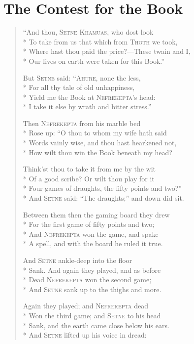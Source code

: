 \documentclass[12pt]{article}
\newcommand{\vin}{\hspace{1em}}
\begin{document}
\section*{The Contest for the Book}

\begin{verse}
``And thou, \textsc{Setne Khamuas}, who dost look\\*
To take from us that which from \textsc{Thoth} we took,\\*
\vin Where hast thou paid the price?---These twain and I,\\*
Our lives on earth were taken for this Book.''

But \textsc{Setne} said: ``\textsc{Ahure}, none the less,\\*
For all thy tale of old unhappiness,\\*
\vin Yield me the Book at \textsc{Nefrekepta}'s head:\\*
I take it else by wrath and bitter stress.''

Then \textsc{Nefrekepta} from his marble bed\\*
Rose up: ``O thou to whom my wife hath said\\*
\vin Words vainly wise, and thou hast hearkened not,\\*
How wilt thou win the Book beneath my head?

Think'st thou to take it from me by the wit\\*
Of a good scribe? Or wilt thou play for it\\*
\vin Four games of draughts, the fifty points and two?''\\*
And \textsc{Setne} said: ``The draughts;'' and down did sit.

Between them then the gaming board they drew\\*
For the first game of fifty points and two;\\*
\vin And \textsc{Nefrekepta} won the game, and spake\\*
A spell, and with the board he ruled it true.

And \textsc{Setne} ankle-deep into the floor\\*
Sank. And again they played, and as before\\*
\vin Dead \textsc{Nefrekepta} won the second game;\\*
And \textsc{Setne} sank up to the thighs and more.

Again they played; and \textsc{Nefrekepta} dead\\*
Won the third game; and \textsc{Setne} to his head\\*
\vin Sank, and the earth came close below his ears.\\*
And \textsc{Setne} lifted up his voice in dread:


\end{verse}
\end{document}
